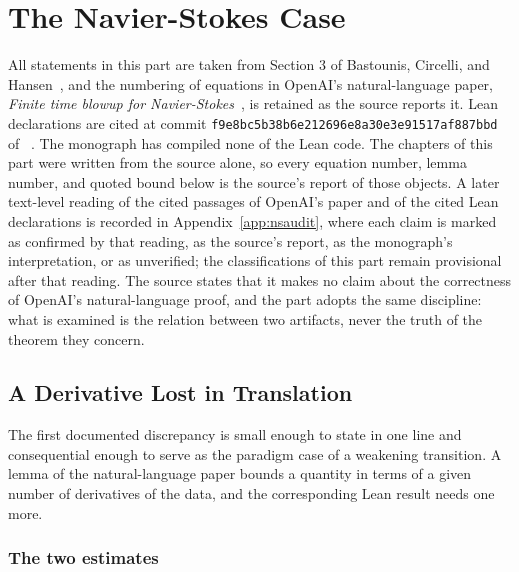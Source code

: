 \setcounter{part}{3}
\part{The Navier-Stokes Case}

All statements in this part are taken from Section 3 of Bastounis, Circelli, and Hansen~\cite{BCH26}, and the numbering of equations in OpenAI's natural-language paper, \emph{Finite time blowup for Navier-Stokes}~\cite{OpenAI26NS}, is retained as the source reports it. Lean declarations are cited at commit \texttt{f9e8bc5b38b6e212696e8a30e3e91517af887bbd} of ~\cite{OpenAI26Lean}. The monograph has compiled none of the Lean code. The chapters of this part were written from the source alone, so every equation number, lemma number, and quoted bound below is the source's report of those objects. A later text-level reading of the cited passages of OpenAI's paper and of the cited Lean declarations is recorded in Appendix~\ref{app:nsaudit}, where each claim is marked as confirmed by that reading, as the source's report, as the monograph's interpretation, or as unverified; the classifications of this part remain provisional after that reading. The source states that it makes no claim about the correctness of OpenAI's natural-language proof, and the part adopts the same discipline: what is examined is the relation between two artifacts, never the truth of the theorem they concern.

\setcounter{chapter}{11}
\chapter{A Derivative Lost in Translation}
\label{ch:derivative}

The first documented discrepancy is small enough to state in one line and consequential enough to serve as the paradigm case of a weakening transition. A lemma of the natural-language paper bounds a quantity in terms of a given number of derivatives of the data, and the corresponding Lean result needs one more.

\section{The two estimates}


